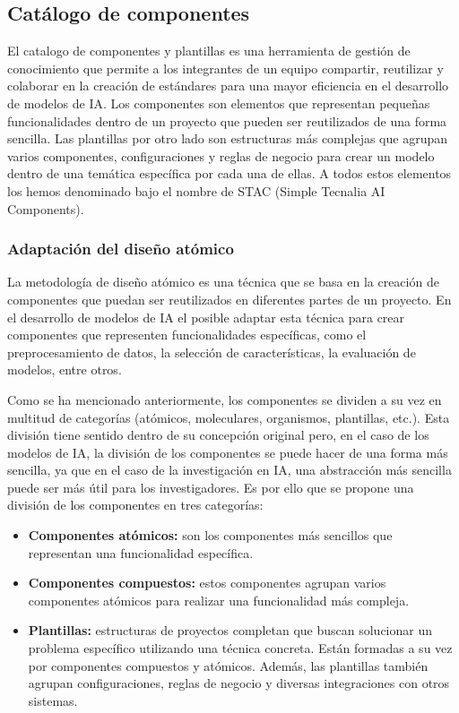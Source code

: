 \subsection{Catálogo de componentes}
El catalogo de componentes y plantillas es una herramienta de gestión
de conocimiento que permite a los integrantes de un equipo compartir,
reutilizar y colaborar en la creación de estándares para una mayor
eficiencia en el desarrollo de modelos de IA. Los componentes son
elementos que representan pequeñas funcionalidades dentro de un
proyecto que pueden ser reutilizados de una forma sencilla. Las plantillas 
por otro lado son estructuras más complejas que agrupan varios componentes, 
configuraciones y reglas de negocio para crear un modelo dentro de una 
temática específica por cada una de ellas. A todos estos elementos los hemos
denominado bajo el nombre de STAC (Simple Tecnalia AI Components).\medskip

\subsubsection{Adaptación del diseño atómico}
La metodología de diseño atómico es una técnica que se basa en la
creación de componentes que puedan ser reutilizados en diferentes partes
de un proyecto. En el desarrollo de modelos de IA el posible adaptar
esta técnica para crear componentes que representen funcionalidades
específicas, como el preprocesamiento de datos, la selección de
características, la evaluación de modelos, entre otros.\medskip

Como se ha mencionado anteriormente, los componentes se dividen
a su vez en multitud de categorías (atómicos, moleculares, organismos, plantillas, etc.).
Esta división tiene sentido dentro de su concepción original pero,
en el caso de los modelos de IA, la división de los componentes se puede hacer
de una forma más sencilla, ya que en el caso de la investigación en IA, una
abstracción más sencilla puede ser más útil para los investigadores. Es por
ello que se propone una división de los componentes en tres categorías:

\begin{itemize}
    \item \textbf{Componentes atómicos:} son los componentes más sencillos
    que representan una funcionalidad específica.
    \item \textbf{Componentes compuestos:} estos componentes agrupan
    varios componentes atómicos para realizar una funcionalidad más
    compleja.
    \item \textbf{Plantillas:} estructuras de proyectos completan que buscan
    solucionar un problema específico utilizando una técnica concreta. Están
    formadas a su vez por componentes compuestos y atómicos. Además, las
    plantillas también agrupan configuraciones, reglas de negocio y
    diversas integraciones con otros sistemas.
\end{itemize}

